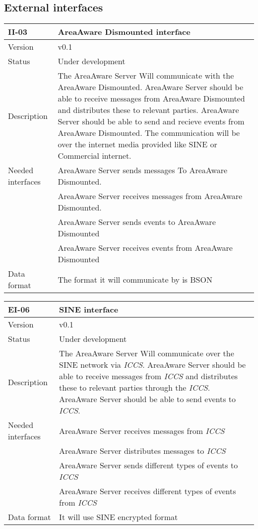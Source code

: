 \subsection{External interfaces}
\begin{longtable}{| p{3.5cm} |  p{10cm} | }
	\hline
	\textbf{II-03} &  \textbf{AreaAware Dismounted interface } \\
	\hline
	Version & v0.1 \\
	\hline
	Status & Under development \\
	\hline
	Description & The AreaAware Server Will communicate with the AreaAware Dismounted. AreaAware Server should be able to receive messages from AreaAware Dismounted and distributes these to relevant parties. AreaAware Server should be able to send and recieve events from AreaAware Dismounted. The communication will be over the internet media provided like SINE or Commercial internet.
	\\
	\hline
	Needed interfaces & AreaAware Server sends messages To AreaAware Dismounted.  \\
	& AreaAware Server receives messages from AreaAware Dismounted. \\
	& AreaAware Server sends events to AreaAware Dismounted  \\
	& AreaAware Server receives events from AreaAware Dismounted  \\
	\hline
	Data format
	& The format it will communicate by is BSON \\
	\hline
\end{longtable}

\begin{longtable}{| p{3.5cm} |  p{10cm} | }
	\hline
	\textbf{EI-06} &  \textbf{SINE interface} \\
	\hline
	Version & v0.1 \\
	\hline
	Status & Under development \\
	\hline
	Description & The AreaAware Server Will communicate over the SINE network via \emph{ICCS}\citep{iccs}. AreaAware Server should be able to receive messages from \emph{ICCS} and distributes these to relevant parties through the \emph{ICCS}.  AreaAware Server should be able to send events to \emph{ICCS}.
	\\
	\hline
	Needed interfaces 
	& AreaAware Server receives messages from \emph{ICCS} \\
	& AreaAware Server distributes messages to \emph{ICCS} \\
	& AreaAware Server sends different types of events to \emph{ICCS} \\
	& AreaAware Server receives different types of events from \emph{ICCS} \\
	\hline
	Data format
	& It will use SINE encrypted format  \\
	\hline
\end{longtable}

